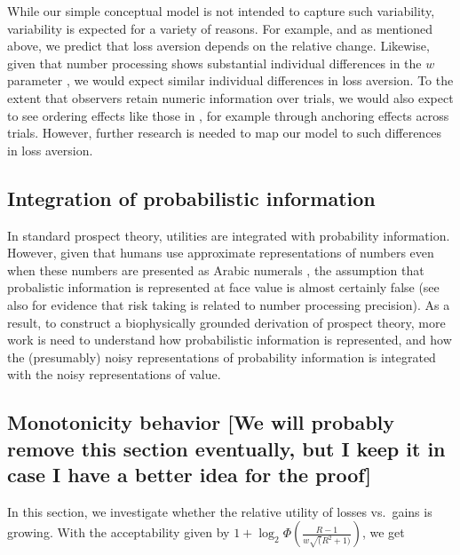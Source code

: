 \documentclass[
]{article}
\begin{document}
While our simple conceptual model is not intended to capture such variability, variability is expected for a variety of reasons. For example, and as mentioned above, we predict that loss aversion depends on the relative change. Likewise, given that number processing shows substantial individual differences in the \(w\) parameter \autocite{Halberda2008}, we would expect similar individual differences in loss aversion. To the extent that observers retain numeric information over trials, we would also expect to see ordering effects like those in \autocite{Yechiam2025}, for example through anchoring effects across trials. However, further research is needed to map our model to such differences in loss aversion.

\subsection{Integration of probabilistic information}\label{integration-of-probabilistic-information}

In standard prospect theory, utilities are integrated with probability information. However, given that humans use approximate representations of numbers even when these numbers are presented as Arabic numerals \autocite{Moyer1967,Buckley1974,Hinrichs1981,Dehaene1990}, the assumption that probalistic information is represented at face value is almost certainly false (see also \autocite{BarrettoGarcia2023,Khaw2020} for evidence that risk taking is related to number processing precision). As a result, to construct a biophysically grounded derivation of prospect theory, more work is need to understand how probabilistic information is represented, and how the (presumably) noisy representations of probability information is integrated with the noisy representations of value.

\subsection{Monotonicity behavior {[}We will probably remove this section eventually, but I keep it in case I have a better idea for the proof{]}}\label{monotonicity-behavior-we-will-probably-remove-this-section-eventually-but-i-keep-it-in-case-i-have-a-better-idea-for-the-proof}

In this section, we investigate whether the relative utility of losses vs.~gains is growing. With the acceptability given by \(1 + \log_2 \Phi\left(\frac{R-1}{w \sqrt(R^2 + 1)}\right)\), we get
\end{document}
